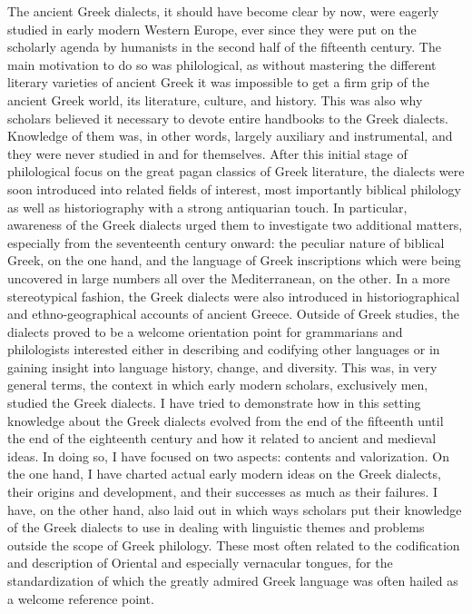 The ancient Greek dialects, it should have become clear by now, were eagerly studied in early modern Western Europe, ever since they were put on the scholarly agenda by humanists in the second half of the fifteenth century. The main motivation to do so was philological, as without mastering the different literary varieties of ancient Greek it was impossible to get a firm grip of the ancient Greek world, its literature, culture, and history. This was also why scholars believed it necessary to devote entire handbooks to the Greek dialects. Knowledge of them was, in other words, largely auxiliary and instrumental, and they were never studied in and for themselves. After this initial stage of philological focus on the great pagan classics of Greek literature, the dialects were soon introduced into related fields of interest, most importantly biblical philology as well as historiography with a strong antiquarian touch. In particular, awareness of the Greek dialects urged them to investigate two additional matters, especially from the seventeenth century onward: the peculiar nature of biblical Greek, on the one hand, and the language of Greek inscriptions which were being uncovered in large numbers all over the Mediterranean, on the other. In a more stereotypical fashion, the Greek dialects were also introduced in historiographical and ethno-geographical accounts of ancient Greece. Outside of Greek studies, the dialects proved to be a welcome orientation point for grammarians and philologists interested either in describing and codifying other languages or in gaining insight into language history, change, and diversity. This was, in very general terms, the context in which early modern scholars, exclusively men, studied the Greek dialects. I have tried to demonstrate how in this setting knowledge about the Greek dialects evolved from the end of the fifteenth until the end of the eighteenth century and how it related to ancient and medieval ideas. In doing so, I have focused on two aspects: contents and valorization. On the one hand, I have charted actual early modern ideas on the Greek dialects, their origins and development, and their successes as much as their failures. I have, on the other hand, also laid out in which ways scholars put their knowledge of the Greek dialects to use in dealing with linguistic themes and problems outside the scope of Greek philology. These most often related to the codification and description of Oriental and especially vernacular tongues, for the standardization of which the greatly admired Greek language was often hailed as a welcome reference point.

